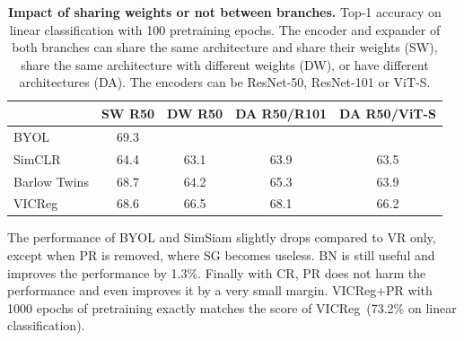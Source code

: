 \documentclass{article} %
\newcommand{\algo}{VICReg}
\newcommand{\expander}{expander }
\newcommand{\Expander}{Expander}
\newcommand{\cmark}{\ding{51}}%
\begin{document}
\newcommand{\xmark}{\ding{55}}%
\begin{table}[t]
\caption{\textbf{Impact of sharing weights or not between branches.} Top-1 accuracy on linear classification with 100 pretraining epochs. The encoder and \expander of both branches can share the same architecture and share their weights (SW), share the same architecture with different weights (DW), or have different architectures (DA). The encoders can be ResNet-50, ResNet-101 or ViT-S.}
\centering
\vspace{-2mm}
\label{tab:non-shared}
\begin{tabular}{lcccc}
\toprule
 & SW R50 & DW R50  & DA R50/R101 & DA R50/ViT-S \\
\midrule
BYOL          & 69.3  & \xmark & \xmark & \xmark \\
SimCLR        & 64.4  & 63.1 & 63.9 & 63.5 \\
Barlow Twins  & 68.7  & 64.2 & 65.3 & 63.9 \\
\algo         & 68.6  & 66.5 & 68.1 & 66.2\\
\bottomrule
\end{tabular}
\end{table}

The performance of BYOL and SimSiam slightly drops compared to VR only, except when PR is removed, where SG becomes useless. BN is still useful and improves the performance by 1.3\%. Finally with CR, PR does not harm the performance and even improves it by a very small margin. \algo+PR with 1000 epochs of pretraining exactly matches the score of \algo \ (73.2\% on linear classification).
\end{document}
